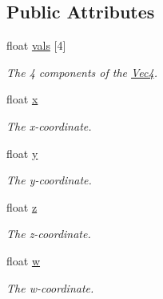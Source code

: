 \subsection*{Public Attributes}
\begin{DoxyCompactItemize}
\item 
float \hyperlink{classgofxmath_1_1_vec4_a72f1c74b748d6fda1d8add90f51dc691}{vals} \mbox{[}4\mbox{]}
\begin{DoxyCompactList}\small\item\em The 4 components of the \hyperlink{classgofxmath_1_1_vec4}{Vec4}. \end{DoxyCompactList}\item 
float \hyperlink{classgofxmath_1_1_vec4_a5de27b4df2e699a1b30ec3a51258f208}{x}
\begin{DoxyCompactList}\small\item\em The x-\/coordinate. \end{DoxyCompactList}\item 
float \hyperlink{classgofxmath_1_1_vec4_a22b749162a1507a1a5d3968b70c6ee4d}{y}
\begin{DoxyCompactList}\small\item\em The y-\/coordinate. \end{DoxyCompactList}\item 
float \hyperlink{classgofxmath_1_1_vec4_a36bc9ebeb3901746c975252b329c1d8c}{z}
\begin{DoxyCompactList}\small\item\em The z-\/coordinate. \end{DoxyCompactList}\item 
float \hyperlink{classgofxmath_1_1_vec4_aeda815ed6e7a8febdffcdfa6cc8a2d04}{w}
\begin{DoxyCompactList}\small\item\em The w-\/coordinate. \end{DoxyCompactList}\end{DoxyCompactItemize}
